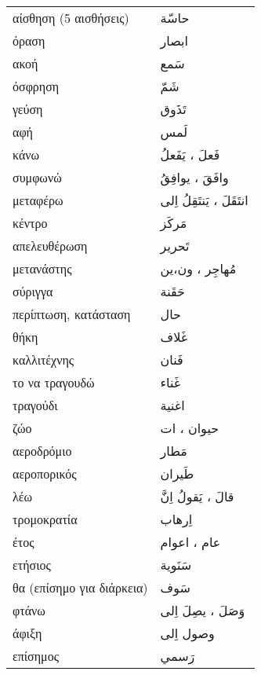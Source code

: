 \documentclass[twocolumn,a4paper]{article}
\newcommand{\ar}[1]{\textarabic{#1}}
\newcommand{\pl}{\raisebox{0.15ex}{\footnotesize ◍}}
\newcommand{\normpl}[1]{\ar{ #1، ات }}
\newcommand{\mfnormpl}[1]{\ar{ #1، ون،ين }}
\newcommand{\vrf}{\raisebox{0.15ex}{\footnotesize ◉}}
\newcommand{\mas}{\raisebox{0.15ex}{\footnotesize ◫}}
\begin{document}
\begin{mpsupertabular}{ P{0.5\textwidth} P{0.5\textwidth} }
αίσθηση (5 αισθήσεις)        & \ar{ حاسّة } \\
όραση                        & \ar{ ابصار } \\
ακοή                         & \ar{ سَمع } \\
όσφρηση                      & \ar{ شَمّ } \\
γεύση                        & \ar{ تَذَوق } \\
αφή                          & \ar{ لَمس } \\
κάνω \vrf                    & \ar{ فَعلَ ، يَفَعلُ } \\
συμφωνώ \vrf                 & \ar{ وافَقَ ، يوافِقُ } \\
μεταφέρω \vrf                & \ar{ انتَقَلَ ، يَنتَقِلُ اِلى} \\
κέντρο                       & \ar{ مَركَز } \\
απελευθέρωση                 & \ar{ تَحرير } \\
μετανάστης  \pl              & \mfnormpl{ مُهاجِر } \\
σύριγγα                      & \ar{ حَقَنة } \\
περίπτωση, κατάσταση         & \ar{ حال } \\
θήκη                         & \ar{ غَلاف } \\
καλλιτέχνης                  & \ar{ فَنان } \\
το να τραγουδώ  \mas         & \ar{ غَناء } \\
τραγούδι                     & \ar{ اغنية } \\
ζώο \pl                      & \normpl{ حيوان } \\
αεροδρόμιο                   & \ar{ مَطار } \\
αεροπορικός                  & \ar{ طَيران } \\
λέω \vrf                     & \ar{ قالَ ، يَقولُ اِنَّ } \\
τρομοκρατία                  & \ar{ اِرهاب } \\
έτος \pl                     & \ar{ عام ، اعوام } \\
ετήσιος                      & \ar{ سَنَوية } \\
θα (επίσημο για διάρκεια)    & \ar{ سَوف } \\
φτάνω \vrf                   & \ar{ وَصَلَ ، يصِلَ اِلى } \\
άφιξη \mas                   & \ar{ وصول اِلى } \\
επίσημος                     & \ar{ رَسمي } \\

\end{mpsupertabular}
\end{document}
